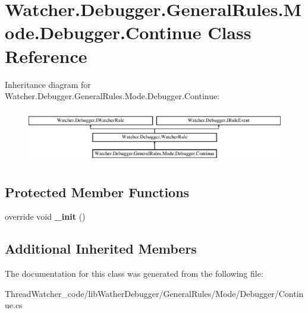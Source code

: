 \hypertarget{class_watcher_1_1_debugger_1_1_general_rules_1_1_mode_1_1_debugger_1_1_continue}{\section{Watcher.\+Debugger.\+General\+Rules.\+Mode.\+Debugger.\+Continue Class Reference}
\label{class_watcher_1_1_debugger_1_1_general_rules_1_1_mode_1_1_debugger_1_1_continue}
}
Inheritance diagram for Watcher.\+Debugger.\+General\+Rules.\+Mode.\+Debugger.\+Continue\+:\begin{figure}[H]
\begin{center}
\leavevmode
\includegraphics[height=2.352941cm]{class_watcher_1_1_debugger_1_1_general_rules_1_1_mode_1_1_debugger_1_1_continue}
\end{center}
\end{figure}
\subsection*{Protected Member Functions}
\begin{DoxyCompactItemize}
\item 
\hypertarget{class_watcher_1_1_debugger_1_1_general_rules_1_1_mode_1_1_debugger_1_1_continue_a5d5b8f69d96a19c306e2c9769bf7ae3e}{override void {\bfseries \+\_\+init} ()}\label{class_watcher_1_1_debugger_1_1_general_rules_1_1_mode_1_1_debugger_1_1_continue_a5d5b8f69d96a19c306e2c9769bf7ae3e}

\end{DoxyCompactItemize}
\subsection*{Additional Inherited Members}


The documentation for this class was generated from the following file\+:\begin{DoxyCompactItemize}
\item 
Thread\+Watcher\+\_\+code/lib\+Wather\+Debugger/\+General\+Rules/\+Mode/\+Debugger/Continue.\+cs\end{DoxyCompactItemize}
